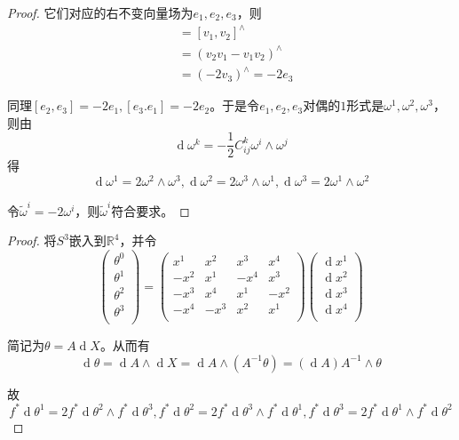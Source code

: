 \documentclass[winfonts,UTF8,c5size,a4paper,fancyhdr,hyperref,titlepage,nocap]{ctexart}
\theoremstyle{definition}
\theoremstyle{remark}
\numberwithin{equation}{subsection}
\newcommand{\Real}{\mathbb{R}}
\newcommand{\dd}{\operatorname{d}}
\begin{document}
\begin{proof}
  它们对应的右不变向量场为$e_1,e_2,e_3$，则
  \begin{align*}
    [e_1,e_2] & = [v_1,v_2]^{\wedge} \\
     & =(v_2v_1-v_1v_2)^{\wedge}\\
     &=(-2v_3)^{\wedge}=-2e_3
  \end{align*}

  同理$[e_2,e_3]=-2e_1,[e_3.e_1]=-2e_2$。于是令$e_1,e_2,e_3$对偶的$1$形式是$\omega^1,\omega^2,\omega^3$，则由
  \begin{equation*}
    \dd\omega^k=-\frac{1}{2}C^k_{ij}\omega^i\wedge\omega^j
  \end{equation*}
  得
  \begin{equation*}
    \dd\omega^1=2\omega^2\wedge\omega^3, \dd\omega^2=2\omega^3\wedge\omega^1, \dd\omega^3=2\omega^1\wedge\omega^2
  \end{equation*}

  令$\widetilde{\omega}^i=-2\omega^i$，则$\widetilde{\omega}^i$符合要求。
\end{proof}
\begin{proof}
  将$S^3$嵌入到$\Real^4$，并令
  \begin{equation*}
    \begin{pmatrix}
       \theta^0 \\
       \theta^1 \\
       \theta^2 \\
       \theta^3 \\
     \end{pmatrix}
     =
     \begin{pmatrix}
       x^1 & x^2 & x^3 & x^4 \\
       -x^2 & x^1 & -x^4 & x^3 \\
       -x^3 & x^4 & x^1 & -x^2 \\
       -x^4 & -x^3 & x^2 & x^1 \\
     \end{pmatrix}
     \begin{pmatrix}
       \dd x^1 \\
       \dd x^2 \\
       \dd x^3 \\
       \dd x^4 \\
     \end{pmatrix}
  \end{equation*}

  简记为$\theta=A\dd X$。从而有
  \begin{equation*}
    \dd\theta=\dd A\wedge\dd X=\dd A\wedge(A^{-1}\theta)=(\dd A)A^{-1}\wedge\theta
  \end{equation*}

  故
  \begin{equation*}
    f^{\ast}\dd\theta^1=2f^{\ast}\dd\theta^2\wedge f^{\ast}\dd\theta^3, f^{\ast}\dd\theta^2=2f^{\ast}\dd\theta^3\wedge f^{\ast}\dd\theta^1, f^{\ast}\dd\theta^3=2f^{\ast}\dd\theta^1\wedge f^{\ast}\dd\theta^2
  \end{equation*}
\end{proof}
\end{document}
